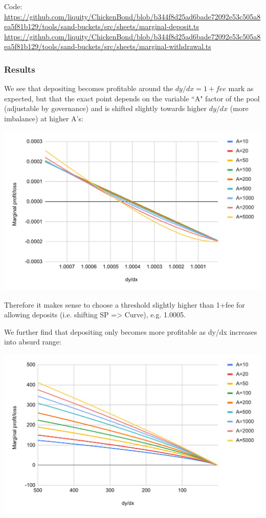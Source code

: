 \documentclass{article}
\begin{document}
Code:
\url{https://github.com/liquity/ChickenBond/blob/b344f8d25ad6bade72092e53c505a8ea5f81b129/tools/sand-buckets/src/sheets/marginal-deposit.ts}
\url{https://github.com/liquity/ChickenBond/blob/b344f8d25ad6bade72092e53c505a8ea5f81b129/tools/sand-buckets/src/sheets/marginal-withdrawal.ts}

\subsubsection{Results}

We see that depositing becomes profitable around the $dy/dx = 1+fee$ mark as expected, but that the exact point depends on the variable ``A" factor of the pool (adjustable by governance) and is shifted slightly towards higher $dy/dx$ (more imbalance) at higher A's:

\includegraphics[width=\linewidth]{./LUSDChickenBonds_Shifting_Profitability_1.png}

Therefore it makes sense to choose a threshold slightly higher than 1+fee for allowing deposits (i.e. shifting SP => Curve), e.g. 1.0005.

We further find that depositing only becomes more profitable as dy/dx increases into absurd range:

\includegraphics[width=\linewidth]{./LUSDChickenBonds_Shifting_Profitability_2.png}
\end{document}
